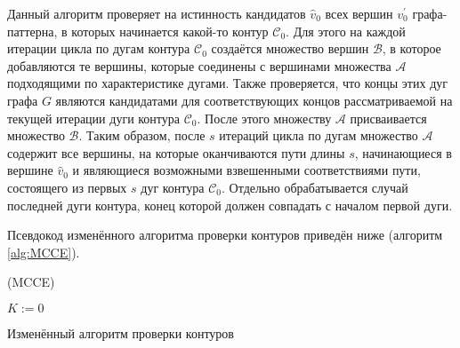 Данный алгоритм проверяет на истинность кандидатов $\widehat{v}_0$ всех вершин $v_0^{\prime}$ графа-паттерна, в которых начинается какой-то контур $\mathcal{C}_0$. Для этого на каждой итерации цикла по дугам контура $\mathcal{C}_0$ создаётся множество вершин $\mathcal{B}$, в которое добавляются те вершины, которые соединены с вершинами множества $\mathcal{A}$ подходящими по характеристике дугами. Также проверяется, что концы этих дуг графа $G$ являются кандидатами для соответствующих концов рассматриваемой на текущей итерации дуги контура $\mathcal{C}_0$. После этого множеству $\mathcal{A}$ присваивается множество $\mathcal{B}$. Таким образом, после $s$ итераций цикла по дугам множество $\mathcal{A}$ содержит все вершины, на которые оканчиваются пути длины $s$, начинающиеся в вершине $\widehat{v}_0$ и являющиеся возможными взвешенными соответствиями пути, состоящего из первых $s$ дуг контура $\mathcal{C}_0$. Отдельно обрабатывается случай последней дуги контура, конец которой должен совпадать с началом первой дуги.

Псевдокод изменённого алгоритма проверки контуров приведён ниже (алгоритм \ref{alg:MCCE}).

\begin{algorithm}[H]
	\Large
	\Begin(MCCE){
		$K := 0$
		
	}
	
	\caption{Изменённый алгоритм проверки контуров}
	\label{alg:MCCE}
\end{algorithm}

